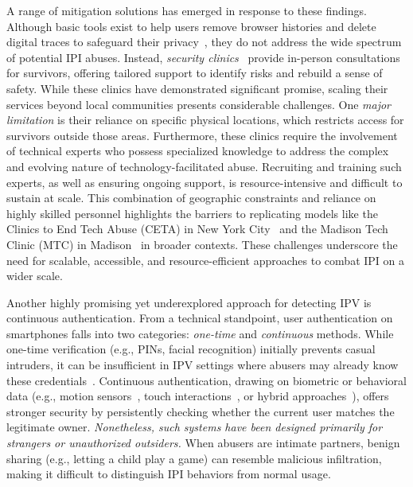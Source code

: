A range of mitigation solutions has emerged in response to these findings. Although basic tools exist to help users remove browser histories and delete digital traces to safeguard their privacy~\cite{arief2014sensible}, they do not address the wide spectrum of potential IPI abuses. Instead, \textit{security clinics}~\cite{havron2019clinical,tseng2022care} provide in-person consultations for survivors, offering tailored support to identify risks and rebuild a sense of safety. While these clinics have demonstrated significant promise, scaling their services beyond local communities presents considerable challenges. 
One \textit{major limitation} is their reliance on specific physical locations, which restricts access for survivors outside those areas. Furthermore, these clinics require the involvement of technical experts who possess specialized knowledge to address the complex and evolving nature of technology-facilitated abuse. Recruiting and training such experts, as well as ensuring ongoing support, is resource-intensive and difficult to sustain at scale. This combination of geographic constraints and reliance on highly skilled personnel highlights the barriers to replicating models like the Clinics to End Tech Abuse (CETA) in New York City~\cite{ceta} and the Madison Tech Clinic (MTC) in Madison~\cite{mtc} in broader contexts. These challenges underscore the need for scalable, accessible, and resource-efficient approaches to combat IPI on a wider scale.

Another highly promising yet underexplored approach for detecting IPV is continuous authentication. From a technical standpoint, user authentication on smartphones falls into two categories: \textit{one-time} and \textit{continuous} methods. While one-time verification (e.g., PINs, facial recognition) initially prevents casual intruders, it can be insufficient in IPV settings where abusers may already know these credentials~\cite{tseng2020tools,xu2014towards}. Continuous authentication, drawing on biometric or behavioral data (e.g., motion sensors~\cite{fereidooni2023authentisense,centeno2018mobile,liu2023amir}, touch interactions~\cite{frank2012touchalytics,xu2014towards,zhao2013continuous}, or hybrid approaches~\cite{deb2019actions,acien2019multilock}), offers stronger security by persistently checking whether the current user matches the legitimate owner. \textit{Nonetheless, such systems have been designed primarily for strangers or unauthorized outsiders.} When abusers are intimate partners, benign sharing (e.g., letting a child play a game) can resemble malicious infiltration, making it difficult to distinguish IPI behaviors from normal usage.


